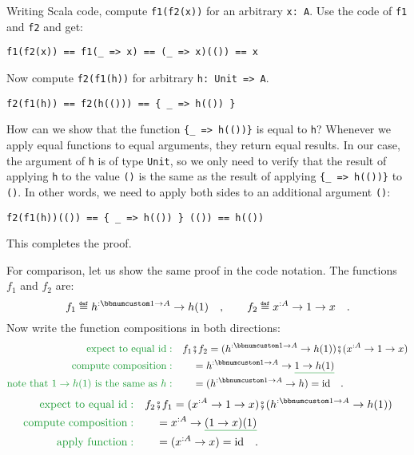 Writing Scala code, compute \lstinline!f1(f2(x))! for an arbitrary
\lstinline!x: A!. Use the code of \lstinline!f1! and \lstinline!f2!
and get:
\begin{lstlisting}
f1(f2(x)) == f1(_ => x) == (_ => x)(()) == x
\end{lstlisting}
Now compute \lstinline!f2(f1(h))! for arbitrary \lstinline!h: Unit => A!.
\begin{lstlisting}
f2(f1(h)) == f2(h(())) == { _ => h(()) }
\end{lstlisting}
How can we show that the function \lstinline!{_ => h(())}! is equal
to \lstinline!h!? Whenever we apply equal functions to equal arguments,
they return equal results. In our case, the argument of \lstinline!h!
is of type \lstinline!Unit!, so we only need to verify that the result
of applying \lstinline!h! to the value \lstinline!()! is the same
as the result of applying \lstinline!{_ => h(())}! to \lstinline!()!.
In other words, we need to apply both sides to an additional argument
\lstinline!()!:
\begin{lstlisting}
f2(f1(h))(()) == { _ => h(()) } (()) == h(())
\end{lstlisting}
This completes the proof.

For comparison, let us show the same proof in the code notation. The
functions $f_{1}$ and $f_{2}$ are:
\[
f_{1}\triangleq h^{:\bbnum 1\rightarrow A}\rightarrow h(1)\quad,\quad\quad f_{2}\triangleq x^{:A}\rightarrow1\rightarrow x\quad.
\]
Now write the function compositions in both directions:
\begin{align*}
{\color{greenunder}\text{expect to equal }\text{id}:}\quad & f_{1}\bef f_{2}=(h^{:\bbnum 1\rightarrow A}\rightarrow h(1))\bef(x^{:A}\rightarrow1\rightarrow x)\\
{\color{greenunder}\text{compute composition}:}\quad & \quad=h^{:\bbnum 1\rightarrow A}\rightarrow\gunderline{1\rightarrow h(1)}\\
{\color{greenunder}\text{note that }1\rightarrow h(1)\text{ is the same as }h:}\quad & \quad=(h^{:\bbnum 1\rightarrow A}\rightarrow h)=\text{id}\quad.
\end{align*}
\begin{align*}
{\color{greenunder}\text{expect to equal }\text{id}:}\quad & f_{2}\bef f_{1}=(x^{:A}\rightarrow1\rightarrow x)\bef(h^{:\bbnum 1\rightarrow A}\rightarrow h(1))\\
{\color{greenunder}\text{compute composition}:}\quad & \quad=x^{:A}\rightarrow\gunderline{(1\rightarrow x)(1)}\\
{\color{greenunder}\text{apply function}:}\quad & \quad=(x^{:A}\rightarrow x)=\text{id}\quad.
\end{align*}

